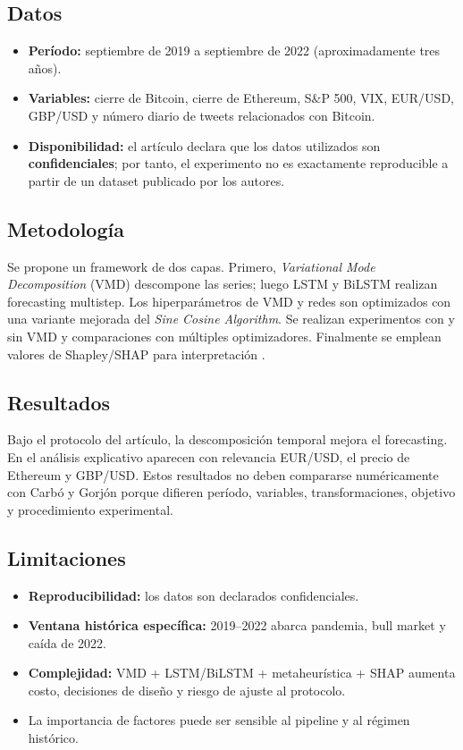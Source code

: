\documentclass[11pt,letterpaper]{article}
\begin{document}
\subsection{Datos}
\begin{itemize}
  \item \textbf{Período:} septiembre de 2019 a septiembre de 2022 (aproximadamente tres años).
  \item \textbf{Variables:} cierre de Bitcoin, cierre de Ethereum, S\&P 500, VIX, EUR/USD, GBP/USD y número diario de tweets relacionados con Bitcoin.
  \item \textbf{Disponibilidad:} el artículo declara que los datos utilizados son \textbf{confidenciales}; por tanto, el experimento no es exactamente reproducible a partir de un dataset publicado por los autores.
\end{itemize}

\subsection{Metodología}
Se propone un framework de dos capas. Primero, \emph{Variational Mode Decomposition} (VMD) descompone las series; luego LSTM y BiLSTM realizan forecasting multistep. Los hiperparámetros de VMD y redes son optimizados con una variante mejorada del \emph{Sine Cosine Algorithm}. Se realizan experimentos con y sin VMD y comparaciones con múltiples optimizadores. Finalmente se emplean valores de Shapley/SHAP para interpretación \parencite{mizdrakovic2024}.

\subsection{Resultados}
Bajo el protocolo del artículo, la descomposición temporal mejora el forecasting. En el análisis explicativo aparecen con relevancia EUR/USD, el precio de Ethereum y GBP/USD. Estos resultados no deben compararse numéricamente con Carbó y Gorjón porque difieren período, variables, transformaciones, objetivo y procedimiento experimental.

\subsection{Limitaciones}
\begin{itemize}
  \item \textbf{Reproducibilidad:} los datos son declarados confidenciales.
  \item \textbf{Ventana histórica específica:} 2019--2022 abarca pandemia, bull market y caída de 2022.
  \item \textbf{Complejidad:} VMD + LSTM/BiLSTM + metaheurística + SHAP aumenta costo, decisiones de diseño y riesgo de ajuste al protocolo.
  \item La importancia de factores puede ser sensible al pipeline y al régimen histórico.
\end{itemize}
\end{document}
